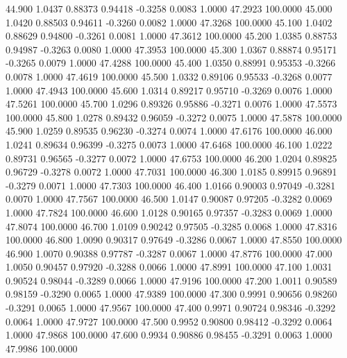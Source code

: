   44.900   1.0437   0.88373   0.94418  -0.3258   0.0083   1.0000  47.2923 100.0000
  45.000   1.0420   0.88503   0.94611  -0.3260   0.0082   1.0000  47.3268 100.0000
  45.100   1.0402   0.88629   0.94800  -0.3261   0.0081   1.0000  47.3612 100.0000
  45.200   1.0385   0.88753   0.94987  -0.3263   0.0080   1.0000  47.3953 100.0000
  45.300   1.0367   0.88874   0.95171  -0.3265   0.0079   1.0000  47.4288 100.0000
  45.400   1.0350   0.88991   0.95353  -0.3266   0.0078   1.0000  47.4619 100.0000
  45.500   1.0332   0.89106   0.95533  -0.3268   0.0077   1.0000  47.4943 100.0000
  45.600   1.0314   0.89217   0.95710  -0.3269   0.0076   1.0000  47.5261 100.0000
  45.700   1.0296   0.89326   0.95886  -0.3271   0.0076   1.0000  47.5573 100.0000
  45.800   1.0278   0.89432   0.96059  -0.3272   0.0075   1.0000  47.5878 100.0000
  45.900   1.0259   0.89535   0.96230  -0.3274   0.0074   1.0000  47.6176 100.0000
  46.000   1.0241   0.89634   0.96399  -0.3275   0.0073   1.0000  47.6468 100.0000
  46.100   1.0222   0.89731   0.96565  -0.3277   0.0072   1.0000  47.6753 100.0000
  46.200   1.0204   0.89825   0.96729  -0.3278   0.0072   1.0000  47.7031 100.0000
  46.300   1.0185   0.89915   0.96891  -0.3279   0.0071   1.0000  47.7303 100.0000
  46.400   1.0166   0.90003   0.97049  -0.3281   0.0070   1.0000  47.7567 100.0000
  46.500   1.0147   0.90087   0.97205  -0.3282   0.0069   1.0000  47.7824 100.0000
  46.600   1.0128   0.90165   0.97357  -0.3283   0.0069   1.0000  47.8074 100.0000
  46.700   1.0109   0.90242   0.97505  -0.3285   0.0068   1.0000  47.8316 100.0000
  46.800   1.0090   0.90317   0.97649  -0.3286   0.0067   1.0000  47.8550 100.0000
  46.900   1.0070   0.90388   0.97787  -0.3287   0.0067   1.0000  47.8776 100.0000
  47.000   1.0050   0.90457   0.97920  -0.3288   0.0066   1.0000  47.8991 100.0000
  47.100   1.0031   0.90524   0.98044  -0.3289   0.0066   1.0000  47.9196 100.0000
  47.200   1.0011   0.90589   0.98159  -0.3290   0.0065   1.0000  47.9389 100.0000
  47.300   0.9991   0.90656   0.98260  -0.3291   0.0065   1.0000  47.9567 100.0000
  47.400   0.9971   0.90724   0.98346  -0.3292   0.0064   1.0000  47.9727 100.0000
  47.500   0.9952   0.90800   0.98412  -0.3292   0.0064   1.0000  47.9868 100.0000
  47.600   0.9934   0.90886   0.98455  -0.3291   0.0063   1.0000  47.9986 100.0000

